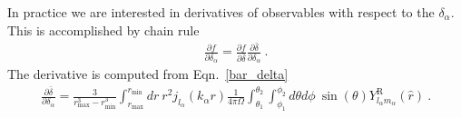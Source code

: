 \documentclass[11pt, oneside]{article}   	%
\newcommand{\sph}[2]{Y^\text{R}_{l_#1 m_#1}(\hat{#2})}
\begin{document}
In practice we are interested in derivatives of observables with respect to the $\delta_\alpha$. This is accomplished by chain rule 
\begin{align}
\frac{\partial f}{\partial \delta_\alpha}= \frac{\partial f}{\partial \bar{\delta}} \frac{\partial \bar{\delta}}{\partial \delta_\alpha}~.
\end{align} 
The derivative is computed from Eqn.~\ref{bar_delta}
\begin{align}
\frac{\partial \bar{\delta} }{ \partial \delta_\alpha}=
\frac{3}{r_\text{max}^3 - r_\text{min}^3} \int_{r_\text{max}}^ {r_\text{min} }dr ~ r^2 j_{l_\alpha}(k_\alpha r)  \frac{1}{4\pi \Omega}  \int_{\theta_1}^{\theta_2 } \int_{\phi_1}^{\phi_2} d\theta d \phi ~\sin(\theta)\sph{\alpha}{r}~.
\end{align}


 
\end{document}
